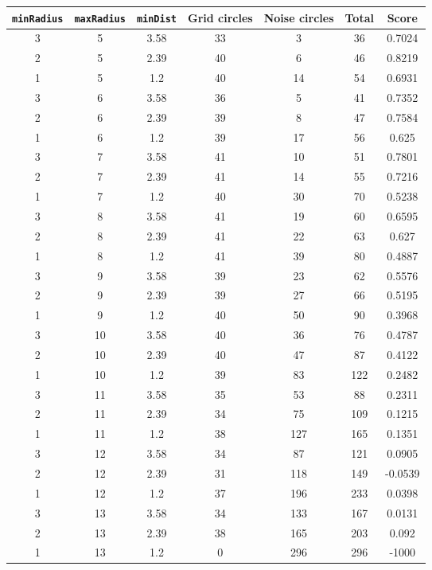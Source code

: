 \documentclass[letterpaper, 12pt]{article}
\begin{document}
\begin{longtable}{|c|c|c|c|c|c|c|}
\hline
\textbf{\texttt{minRadius}} & \textbf{\texttt{maxRadius}} & \textbf{\texttt{minDist}} & \textbf{Grid circles} & \textbf{Noise circles} & \textbf{Total} & \textbf{Score} \\
\hline
3 & 5 & 3.58 & 33 & 3 & 36 & 0.7024 \\
\hline
2 & 5 & 2.39 & 40 & 6 & 46 & 0.8219 \\
\hline
1 & 5 & 1.2 & 40 & 14 & 54 & 0.6931 \\
\hline
3 & 6 & 3.58 & 36 & 5 & 41 & 0.7352 \\
\hline
2 & 6 & 2.39 & 39 & 8 & 47 & 0.7584 \\
\hline
1 & 6 & 1.2 & 39 & 17 & 56 & 0.625 \\
\hline
3 & 7 & 3.58 & 41 & 10 & 51 & 0.7801 \\
\hline
2 & 7 & 2.39 & 41 & 14 & 55 & 0.7216 \\
\hline
1 & 7 & 1.2 & 40 & 30 & 70 & 0.5238 \\
\hline
3 & 8 & 3.58 & 41 & 19 & 60 & 0.6595 \\
\hline
2 & 8 & 2.39 & 41 & 22 & 63 & 0.627 \\
\hline
1 & 8 & 1.2 & 41 & 39 & 80 & 0.4887 \\
\hline
3 & 9 & 3.58 & 39 & 23 & 62 & 0.5576 \\
\hline
2 & 9 & 2.39 & 39 & 27 & 66 & 0.5195 \\
\hline
1 & 9 & 1.2 & 40 & 50 & 90 & 0.3968 \\
\hline
3 & 10 & 3.58 & 40 & 36 & 76 & 0.4787 \\
\hline
2 & 10 & 2.39 & 40 & 47 & 87 & 0.4122 \\
\hline
1 & 10 & 1.2 & 39 & 83 & 122 & 0.2482 \\
\hline
3 & 11 & 3.58 & 35 & 53 & 88 & 0.2311 \\
\hline
2 & 11 & 2.39 & 34 & 75 & 109 & 0.1215 \\
\hline
1 & 11 & 1.2 & 38 & 127 & 165 & 0.1351 \\
\hline
3 & 12 & 3.58 & 34 & 87 & 121 & 0.0905 \\
\hline
2 & 12 & 2.39 & 31 & 118 & 149 & -0.0539 \\
\hline
1 & 12 & 1.2 & 37 & 196 & 233 & 0.0398 \\
\hline
3 & 13 & 3.58 & 34 & 133 & 167 & 0.0131 \\
\hline
2 & 13 & 2.39 & 38 & 165 & 203 & 0.092 \\
\hline
1 & 13 & 1.2 & 0 & 296 & 296 & -1000 \\

\end{longtable}
\end{document}
